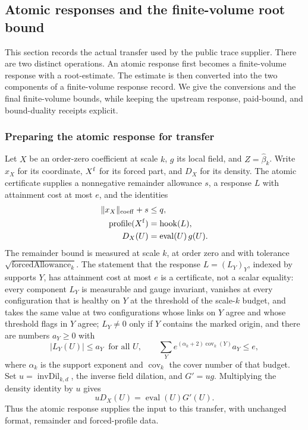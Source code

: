 \subsection{Atomic responses and the finite-volume root bound}
\label{sec:ex-lattice-trace-coffer-supplier}

This section records the actual transfer used by the public trace supplier.
There are two distinct operations. An atomic response first becomes a
finite-volume response with a root-estimate. The estimate is
then converted into the two components of a finite-volume response record. We give the conversions
and the final finite-volume bounds, while keeping the
upstream response, paid-bound, and bound-duality receipts explicit.

\subsubsection{Preparing the atomic response for transfer}

Let \(X\) be an order-zero coefficient at scale \(k\), \(g\) its local field,
and \(Z=\widehat\beta_k\). Write \(x_X\) for its coordinate, \(X^{\rm f}\) for its forced part, and \(D_X\) for its density. The atomic certificate supplies a nonnegative
remainder allowance \(s\), a response \(L\) with attainment cost at most
\(e\), and
the identities
\begin{align}
 \|x_X\|_{\rm coeff}+s&\leq q, \label{eq:ex-trace-atomd-charge}\\
 \operatorname{profile}(X^{\rm f})&=\operatorname{hook}(L),\\
 D_X(U)&=\operatorname{eval}(U)\,g(U).
 \label{eq:ex-trace-atomd-data}
\end{align}
The remainder bound is measured at scale \(k\), at order zero and with
tolerance \(\sqrt{\operatorname{forcedAllowance}_k}\). The statement that
the response \(L=(L_Y)_Y\), indexed by supports \(Y\), has attainment cost
at most \(e\) is a certificate, not a scalar equality: every component
\(L_Y\) is measurable and gauge invariant, vanishes at every configuration
that is healthy on \(Y\) at the threshold of the scale-\(k\) budget, and
takes the same value at two configurations whose links on \(Y\) agree and
whose threshold flags in \(Y\) agree; \(L_Y\neq0\) only if \(Y\) contains
the marked origin, and there are numbers \(a_Y\geq0\) with
\[
 |L_Y(U)|\leq a_Y\ \text{ for all }U,\qquad
 \sum_Y e^{(\alpha_k+2)\operatorname{cov}_k(Y)}a_Y\leq e,
\]
where \(\alpha_k\) is the support exponent and \(\operatorname{cov}_k\)
the cover number of that budget. Set
\(u=\operatorname{invDil}_{k,d}\), the inverse field dilation, and \(G'=ug\).
Multiplying the density identity by \(u\) gives
\[
 uD_X(U)=\operatorname{eval}(U)G'(U).
\]
Thus the atomic response supplies the input to this transfer, with unchanged format,
remainder and forced-profile data.

